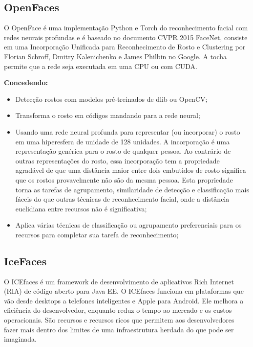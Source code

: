 \documentclass[12pt,a4paper]{article}
\begin{document}
\subsection{OpenFaces}
O OpenFace é uma implementação Python e Torch do reconhecimento facial com redes neurais profundas e é baseado no documento CVPR 2015 FaceNet, consiste em uma Incorporação Unificada para Reconhecimento de Rosto e Clustering por Florian Schroff, Dmitry Kalenichenko e James Philbin no Google. A tocha permite que a rede seja executada em uma CPU ou com CUDA. 

\textbf{Concedendo:}
\begin{itemize}
\item Detecção rostos com modelos pré-treinados de dlib ou OpenCV;

\item Transforma o rosto em códigos mandando para a rede neural;

\item Usando uma rede neural profunda para representar (ou incorporar) o rosto em uma hiperesfera de unidade de 128 unidades. A incorporação é uma representação genérica para o rosto de qualquer pessoa. Ao contrário de outras representações do rosto, essa incorporação tem a propriedade agradável de que uma distância maior entre dois embutidos de rosto significa que os rostos provavelmente não são da mesma pessoa. Esta propriedade torna as tarefas de agrupamento, similaridade de detecção e classificação mais fáceis do que outras técnicas de reconhecimento facial, onde a distância euclidiana entre recursos não é significativa;

\item Aplica várias técnicas de classificação ou agrupamento preferenciais para os recursos para completar sua tarefa de reconhecimento;
\end{itemize}

\subsection{IceFaces}
O ICEfaces é um framework de desenvolvimento de aplicativos Rich Internet (RIA) de código aberto para Java EE. O ICEfaces funciona em plataformas que vão desde desktops a telefones inteligentes e Apple para Android. Ele melhora a eficiência do desenvolvedor, enquanto reduz o tempo ao mercado e os custos operacionais. São recursos e recursos ricos que permitem aos desenvolvedores fazer mais dentro dos limites de uma infraestrutura herdada do que pode ser imaginada.
 
\end{document}
